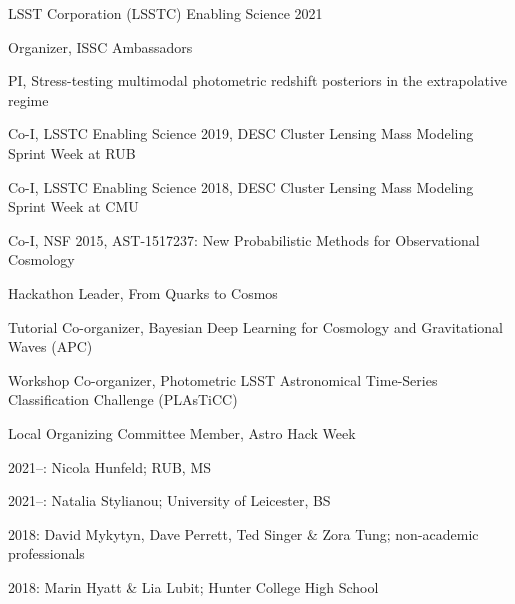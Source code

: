 \documentclass[11pt,letterpaper]{article}
\begin{document}
 \begin{list}{}{\malzlist}
 \item LSST Corporation (LSSTC) Enabling Science 2021
\begin{list}{}{\malzlist}
	\item Organizer, ISSC Ambassadors 
	\item PI, Stress-testing multimodal photometric redshift posteriors in the extrapolative regime
\end{list}
 \item Co-I, LSSTC Enabling Science 2019, DESC Cluster Lensing Mass Modeling Sprint Week at RUB
 \item Co-I, LSSTC Enabling Science 2018, DESC Cluster Lensing Mass Modeling Sprint Week at CMU
\item Co-I, NSF 2015, AST-1517237: New Probabilistic Methods for Observational Cosmology
\end{list}

\nopagebreak\begin{list}{}{\malzlist}
	\item Hackathon Leader, From Quarks to Cosmos 
	\item Tutorial Co-organizer, Bayesian Deep Learning for Cosmology and Gravitational Waves  (APC) 
	\item Workshop Co-organizer, Photometric LSST Astronomical Time-Series Classification Challenge (PLAsTiCC) 
	\item Local Organizing Committee Member, Astro Hack Week 
\end{list}

\begin{list}{}{\malzlist}
	\item 2021--: Nicola Hunfeld; RUB, MS 
	\item 2021--: Natalia Stylianou; University of Leicester, BS 
	\item 2018: David Mykytyn, Dave Perrett, Ted Singer \& Zora Tung; non-academic professionals
	\item 2018: Marin Hyatt \& Lia Lubit; Hunter College High School 
\end{list}
\end{document}
